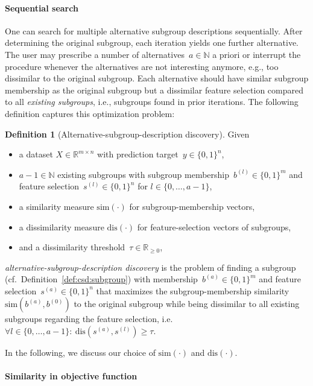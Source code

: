 \documentclass{article}
\theoremstyle{definition}
\newtheorem{definition}{Definition}
\begin{document}
\paragraph{Sequential search}

One can search for multiple alternative subgroup descriptions sequentially.
After determining the original subgroup, each iteration yields one further alternative.
The user may prescribe a number of alternatives~$a \in \mathbb{N}$ a priori or interrupt the procedure whenever the alternatives are not interesting anymore, e.g., too dissimilar to the original subgroup.
Each alternative should have similar subgroup membership as the original subgroup but a dissimilar feature selection compared to all \emph{existing subgroups}, i.e., subgroups found in prior iterations.
The following definition captures this optimization problem:
%
\begin{definition}[Alternative-subgroup-description discovery]
	Given
	\begin{itemize}[noitemsep]
		\item a dataset $X \in \mathbb{R}^{m \times n}$ with prediction target~$y \in \{0, 1\}^n$,
		\item $a-1 \in \mathbb{N}$ existing subgroups with subgroup membership~$b^{(l)} \in \{0, 1\}^m$ and feature selection~$s^{(l)} \in \{0, 1\}^n$ for $l \in \{0, \dots, a - 1\}$,
		\item a similarity measure $\text{sim}(\cdot)$ for subgroup-membership vectors,
		\item a dissimilarity measure $\text{dis}(\cdot)$ for feature-selection vectors of subgroups,
		\item and a dissimilarity threshold~$\tau \in \mathbb{R}_{\geq 0}$,
	\end{itemize}
	\emph{alternative-subgroup-description discovery} is the problem of finding a subgroup (cf.~Definition~\ref{def:csd:subgroup}) with membership~$b^{(a)} \in \{0, 1\}^m$ and feature selection~$s^{(a)} \in \{0, 1\}^n$ that maximizes the subgroup-membership similarity $\text{sim}(b^{(a)}, b^{(0)})$ to the original subgroup while being dissimilar to all existing subgroups regarding the feature selection, i.e. $\forall l \in \{0, \dots, a-1\}:~\text{dis}(s^{(a)}, s^{(l)}) \geq \tau$.
	\label{def:csd:alternative-subgroup-description-discovery}
\end{definition}
%
In the following, we discuss our choice of $\text{sim}(\cdot)$ and $\text{dis}(\cdot)$.

\paragraph{Similarity in objective function}
\end{document}
